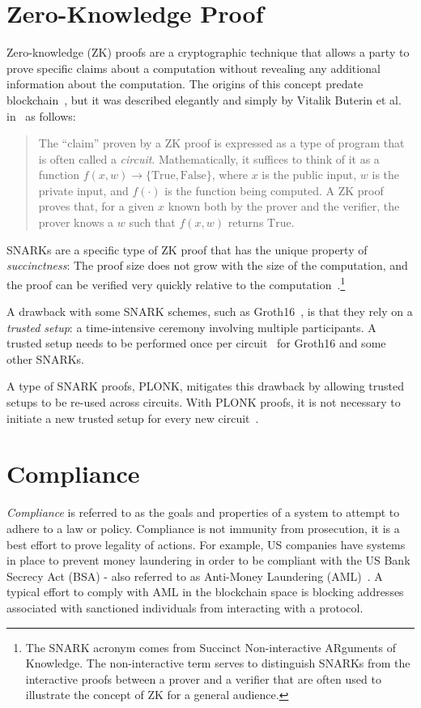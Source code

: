 \documentclass[9pt]{extreport}
\begin{document}
\section{Zero-Knowledge Proof}
\label{sec:zk}
Zero-knowledge (ZK) proofs are a cryptographic technique that allows a party to prove specific claims about a computation without revealing any additional information about the computation.  The origins of this concept
predate blockchain~\cite{ZK88,ZK-origins}, but it was described elegantly and simply by Vitalik Buterin et al. in~\cite{buterin2023blockchain}
as follows:
\begin{quote}
The ``claim'' proven by a ZK proof is expressed as a type of program that is often called a \textit{circuit}.  Mathematically, it suffices to think of it as a function $f(x, w) \rightarrow \{\text{True}, \text{False}\}$, where $x$ is the public input, $w$ is the private input, and $f(\cdot)$ is the function being computed. A ZK proof proves that, for a given $x$ known both by the prover and the verifier, the prover knows a $w$ such that $f(x, w)$ returns $\text{True}$.  
\end{quote}


SNARKs are a specific type of ZK proof that has the unique property of \textit{succinctness}: The proof size does not grow with the size of the computation, and the proof can be verified very quickly relative to the computation~\cite{Petkus}.\footnote{The SNARK acronym comes from Succinct Non-interactive ARguments of Knowledge. The non-interactive term serves to distinguish SNARKs from the interactive proofs between a prover and a verifier that are often used to illustrate the concept of ZK for a general audience.}

A drawback with some SNARK schemes, such as Groth16~\cite{Groth:2016}, is that they rely on a \textit{trusted setup}: a time-intensive ceremony involving multiple participants.  A trusted setup needs to be performed once per circuit~\cite{lavin2024surveyapplicationszeroknowledgeproofs} for Groth16 and some other SNARKs.

A type of SNARK proofs, PLONK, mitigates this drawback by allowing trusted setups to be re-used across circuits.  With PLONK proofs, it is not necessary to initiate a new trusted setup for every new circuit~\cite{Gabizon2019PLONKPO}.

\section{Compliance}
\label{sec:compliance}
\textit{Compliance} is referred to as the goals and properties of a system to attempt to adhere to a law or policy.  Compliance is not immunity from prosecution, it is a best effort to prove legality of actions.  For example, US companies have systems in place to prevent money laundering in order to be compliant with the US Bank Secrecy Act (BSA) - also referred to as Anti-Money Laundering (AML)~\cite{usc31_5318h}.  A typical effort to comply with AML in the blockchain space is blocking addresses associated with sanctioned individuals from interacting with a protocol.  
\end{document}
